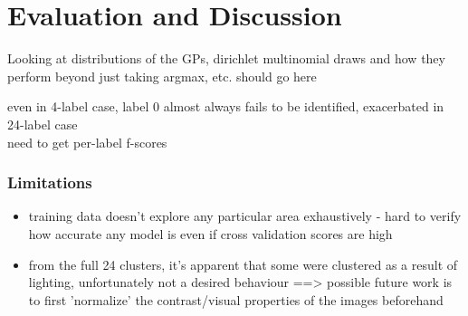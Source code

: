 \chapter{Evaluation and Discussion} \label{chap:evaluation}

 Looking at distributions of the GPs, dirichlet multinomial draws and how they perform beyond just taking argmax, etc. should go here

even in 4-label case, label 0 almost always fails to be identified, exacerbated in 24-label case\\
need to get per-label f-scores

\subsection{Limitations}

\begin{itemize}
    \item training data doesn't explore any particular area exhaustively - hard to verify how accurate any model is even if cross validation scores are high
    \item from the full 24 clusters, it's apparent that some were clustered as a result of lighting, unfortunately not a desired behaviour ==> possible future work is to first 'normalize' the contrast/visual properties of the images beforehand 
\end{itemize}
